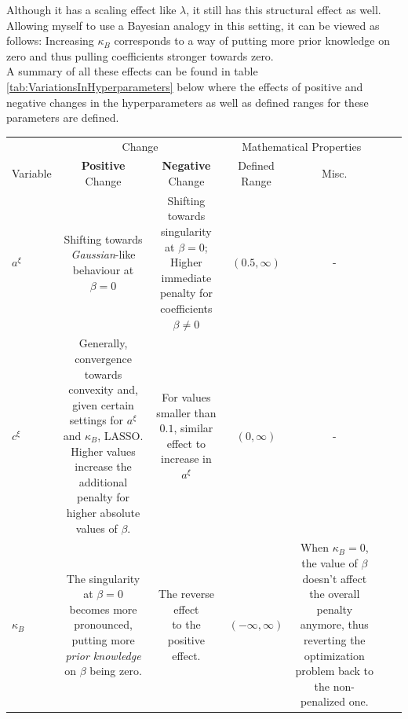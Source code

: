 \documentclass[12pt,a4paper]{article}
\begin{document}
Although it has a scaling effect like $\lambda$, it still has this structural effect as well. Allowing myself to use a Bayesian analogy in this setting, it can be viewed as follows: Increasing $\kappa_B$ corresponds to a way of putting more prior knowledge on zero and thus pulling coefficients stronger towards zero.\\

A summary of all these effects can be found in table \ref{tab:VariationsInHyperparameters} below where the effects of positive and negative changes in the hyperparameters as well as defined ranges for these parameters are defined. 

\newpage
\begin{landscape}
\hspace{3cm}
\begin{table}[h!]
\centering
\begin{tabular}{lcccccc}\toprule
		& \multicolumn{2}{c}{Change} & \multicolumn{2}{c}{Mathematical Properties}\\
		\cmidrule(r{4pt}){2-3} \cmidrule(l){4-5}
Variable     	& \textbf{Positive} Change  & \textbf{Negative} Change & Defined Range & Misc.\\\midrule
$a^\xi$  	& \makecell{Shifting towards\\ \textit{Gaussian}-like behaviour\\ at $\beta = 0$} & \makecell{Shifting towards singularity\\ at $\beta = 0$; Higher\\ immediate penalty\\ for coefficients\\ $\beta \neq 0$} & $(0.5, \infty)$ & -\\
$c^\xi$ 		& \makecell{Generally, convergence towards \\ convexity and, given certain \\ settings for $a^\xi$ and\\ $\kappa_B$, LASSO. Higher values\\ increase the additional penalty\\ for higher absolute values of $\beta$.} &  \makecell{For values smaller \\ than $0.1$, similar effect\\ to increase in $a^\xi$} & $(0, \infty)$ & - \\
$\kappa_B$ 	& \makecell{The singularity\\ at $\beta=0$ becomes more\\ pronounced, putting more\\ \textit{prior knowledge} on $\beta$\\ being zero.} & \makecell{The reverse effect\\ to the positive effect.} & $(-\infty, \infty)$ & \makecell{When $\kappa_B=0$, the\\ value of $\beta$ doesn't affect\\ the overall penalty anymore,\\ thus reverting the optimization\\ problem back to the\\ non-penalized one.} \\\bottomrule

\end{tabular}
\end{table}
\end{landscape}
\end{document}
